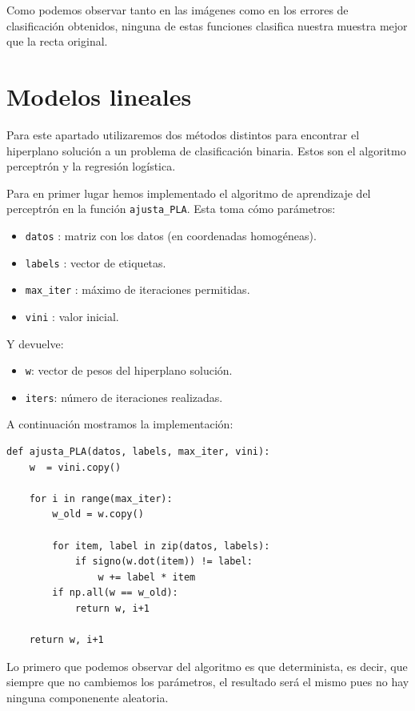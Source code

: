 \documentclass[
  a4paper,
  spanish,
  12pt,
  enlargefirstpage,
]{scrartcl}
\begin{document}
Como podemos observar tanto en las imágenes como en los errores de clasificación obtenidos, ninguna de estas funciones clasifica nuestra muestra mejor que la recta original.

\section{Modelos lineales}%
\label{sec:modelos_lineales}
Para este apartado utilizaremos dos métodos distintos para encontrar el hiperplano solución a un problema de clasificación binaria. Estos son el algoritmo perceptrón y la regresión logística.

Para en primer lugar hemos implementado el algoritmo de aprendizaje del perceptrón en la función \texttt{ajusta\_PLA}. Esta toma cómo parámetros:
\begin{itemize}
    \item \texttt{datos} : matriz con los datos (en coordenadas homogéneas).
    \item \texttt{labels} : vector de etiquetas.
    \item \texttt{max\_iter}  : máximo de iteraciones permitidas.
    \item \texttt{vini} : valor inicial.
\end{itemize}

Y devuelve:
\begin{itemize}
    \item \texttt{w}: vector de pesos del hiperplano solución.
    \item \texttt{iters}: número de iteraciones realizadas.

\end{itemize}

A continuación mostramos la implementación:

\begin{lstlisting}[]
def ajusta_PLA(datos, labels, max_iter, vini):
    w  = vini.copy()

    for i in range(max_iter):
        w_old = w.copy()

        for item, label in zip(datos, labels):
            if signo(w.dot(item)) != label:
                w += label * item
        if np.all(w == w_old):
            return w, i+1

    return w, i+1

\end{lstlisting}

Lo primero que podemos observar del algoritmo es que determinista, es decir, que siempre que no cambiemos los parámetros, el resultado será el mismo pues no hay ninguna componenente aleatoria.
\end{document}
